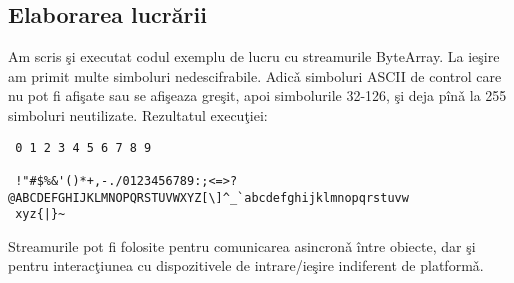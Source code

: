 \subsection{Elaborarea lucr\u{a}rii}
Am scris \c{s}i executat codul exemplu de lucru cu streamurile ByteArray. La ie\c{s}ire am primit
multe simboluri nedescifrabile. Adic\v{a} simboluri ASCII de control care nu pot fi afi\c{s}ate
sau se afi\c{s}eaza gre\c{s}it, apoi simbolurile 32-126, \c{s}i deja p\^{i}n\v{a} la 255 simboluri neutilizate. Rezultatul execu\c{t}iei:
\begin{verbatim}
 0 1 2 3 4 5 6 7 8 9

 !"#$%&'()*+,-./0123456789:;<=>?@ABCDEFGHIJKLMNOPQRSTUVWXYZ[\]^_`abcdefghijklmnopqrstuvw
 xyz{|}~
\end{verbatim}

Streamurile pot fi folosite pentru comunicarea asincron\v{a} \^{i}ntre obiecte, dar \c{s}i
pentru interac\c{t}iunea cu dispozitivele de intrare/ie\c{s}ire indiferent de platform\v{a}.
